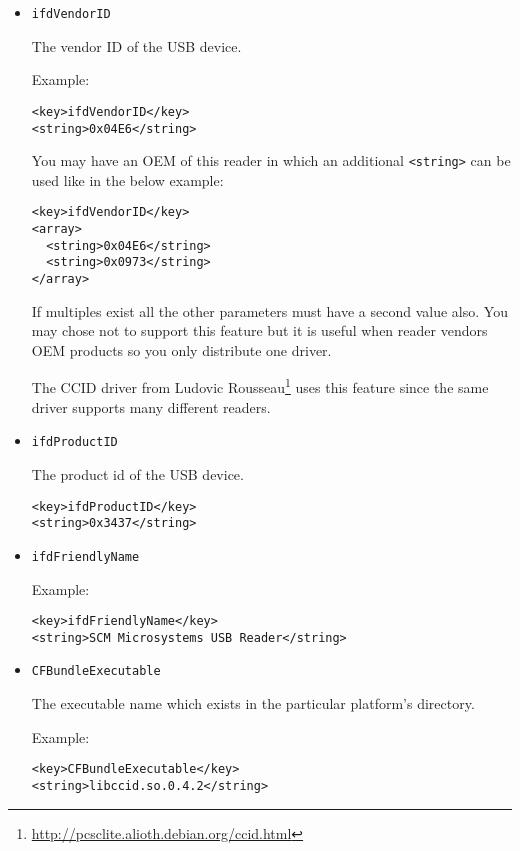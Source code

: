 \documentclass[a4paper,12pt]{article}
\begin{document}
\begin{itemize}
\item \texttt{ifdVendorID}

The vendor ID of the USB device.

Example:
\begin{verbatim}
<key>ifdVendorID</key>
<string>0x04E6</string>
\end{verbatim}

You may have an OEM of this reader in which an additional
\texttt{<string>} can be used like in the below example:
\begin{verbatim}
<key>ifdVendorID</key>
<array>
  <string>0x04E6</string>
  <string>0x0973</string>
</array>
\end{verbatim}

If multiples exist all the other parameters must have a second value
also. You may chose not to support this feature but it is useful when
reader vendors OEM products so you only distribute one driver.

The CCID driver from Ludovic
Rousseau\footnote{\url{http://pcsclite.alioth.debian.org/ccid.html}}
uses this feature since the same driver supports many different readers.

\item \texttt{ifdProductID}

The product id of the USB device.

\begin{verbatim}
<key>ifdProductID</key>
<string>0x3437</string>
\end{verbatim}

\item \texttt{ifdFriendlyName}

Example:
\begin{verbatim}
<key>ifdFriendlyName</key>
<string>SCM Microsystems USB Reader</string>
\end{verbatim}

\item \texttt{CFBundleExecutable}

The executable name which exists in the particular platform's directory.

Example:
\begin{verbatim}
<key>CFBundleExecutable</key>
<string>libccid.so.0.4.2</string>
\end{verbatim}

\end{itemize}
\end{document}
